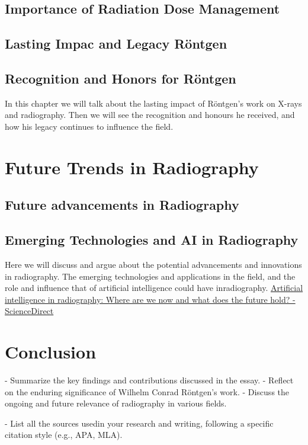 \documentclass[a4paper,12pt]{report}
\begin{document}
\section{Importance of Radiation Dose Management}
\section{Lasting Impac and Legacy Röntgen}
\section{Recognition and Honors for Röntgen}
In this chapter we will talk about the lasting impact of Röntgen's work on X-rays and radiography. Then we will see the recognition and honours he received, and how his legacy continues to influence the field.

\chapter{Future Trends in Radiography}
\section{Future advancements in Radiography}
\section{Emerging Technologies and AI in Radiography}
Here we will discuss and argue about the potential advancements and innovations in radiography. The emerging technologies and applications in the field, and the role and influence that of artificial intelligence could have inradiography.
\href{https://www.sciencedirect.com/science/article/abs/pii/S107881742100095X}{Artificial intelligence in radiography: Where are we now and what does the future hold? - ScienceDirect }
\chapter{Conclusion}

- Summarize the key findings and contributions discussed in the essay.
- Reflect on the enduring significance of Wilhelm Conrad Röntgen's work.
- Discuss the ongoing and future relevance of radiography in various fields.



\printbibheading
- List all the sources usedin your research and writing, following a specific citation style (e.g., APA, MLA).\\[1ex]
\end{document}
